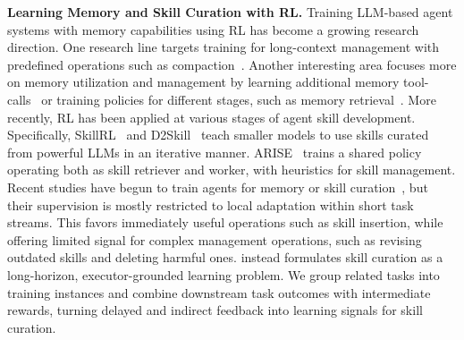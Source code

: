 \noindent\textbf{Learning Memory and Skill Curation with RL.} 
Training LLM-based agent systems with memory capabilities using RL has become a growing research direction. One research line targets training for long-context management with predefined operations such as compaction~\citep{zhou2026mem, yu2026memagent, wang2025mem}. Another interesting area focuses more on memory utilization and management by learning additional memory tool-calls~\citep{DBLP:journals/corr/abs-2508-19828, DBLP:journals/corr/abs-2508-16629, DBLP:journals/corr/abs-2510-12635} or training policies for different stages, such as memory retrieval~\citep{zhang2026memrl}. More recently, RL has been applied at various stages of agent skill development. Specifically, SkillRL~\citep{xia2026skillrl} and D2Skill~\citep{tu2026dynamic} teach smaller models to use skills curated from powerful LLMs in an iterative manner. ARISE~\citep{Li2026ARISEAR} trains a shared policy operating both as skill retriever and worker, with heuristics for skill management. 
Recent studies have begun to train agents for memory or skill curation~\citep{DBLP:journals/corr/abs-2512-17102, DBLP:journals/corr/abs-2602-10652}, but their supervision is mostly restricted to local adaptation within short task streams. This favors immediately useful operations such as skill insertion, while offering limited signal for complex management operations, such as revising outdated skills and deleting harmful ones. \ours{} instead formulates skill curation as a long-horizon, executor-grounded learning problem. We group related tasks into training instances and combine downstream task outcomes with intermediate rewards, turning delayed and indirect feedback into learning signals for skill curation.
